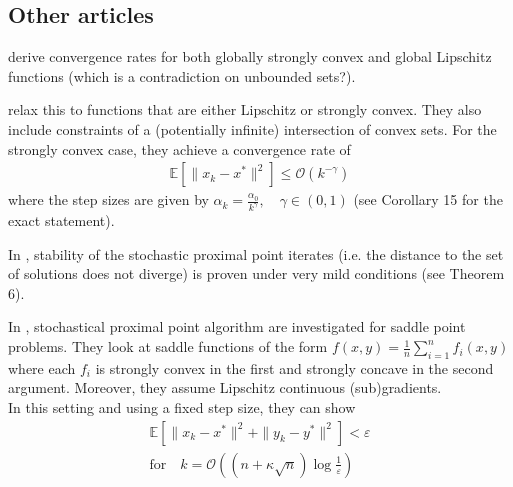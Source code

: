 \documentclass[12pt,a4paper,twoside]{article}
\theoremstyle{plain}
\theoremstyle{note}
\numberwithin{thm}{section}
\let\epsilon\varepsilon
\begin{document}
	
	\subsection{Other articles}
	\cite{Toulis2017} derive convergence rates for both globally strongly convex and global Lipschitz functions (which is a contradiction on unbounded sets?). \\
	\medskip
	
	\cite{Patrascu2017} relax this to functions that are either Lipschitz or strongly convex. They also include constraints of a (potentially infinite) intersection of convex sets. 
	For the strongly convex case, they achieve a convergence rate of 
	\begin{align*}
		\mathbb{E}[\|x_k - x^\ast\|^2] \leq \mathcal{O}(k^{-\gamma})
	\end{align*}
	where the step sizes are given by $\alpha_k = \frac{\alpha_0}{k^\gamma},\quad \gamma \in (0,1)$ (see Corollary 15 for the exact statement).\\
	\medskip
	
	In \cite{Boyd2014}, stability of the stochastic proximal point iterates (i.e. the distance to the set of solutions does not diverge) is proven under very mild conditions (see Theorem 6).
	
	In \cite{Luo2019}, stochastical proximal point algorithm are investigated for saddle point problems. They look at saddle functions of the form $f(x,y) = \frac{1}{n}\sum_{i=1}^{n} f_i(x,y)$ where each $f_i$ is strongly convex in the first and strongly concave in the second argument. Moreover, they assume Lipschitz continuous (sub)gradients.\\
	In this setting and using a fixed step size, they can show 
	\begin{align*}
		\mathbb{E}[\|x_k - x^\ast\|^2 + \|y_k - y^\ast\|^2] < \epsilon \\
		\text{for}\quad k = \mathcal{O}((n+\kappa\sqrt{n}) \log \frac{1}{\epsilon})
	\end{align*}
	
	\clearpage
	
\end{document}
